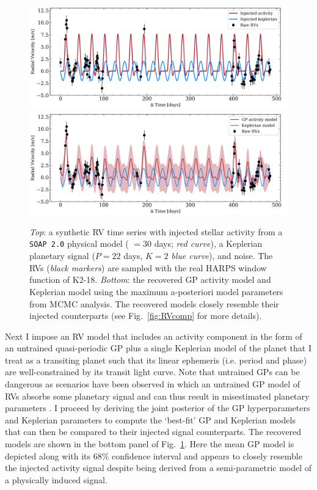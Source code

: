 \begin{figure}
  \centering
  \includegraphics[width=\hsize]{figures/RVinjected.png}
  \includegraphics[width=\hsize]{figures/RVrecovered.png}
  \caption[Synthetic RV time series used to demonstrate the effectiveness of GP activity modelling.]
          {\emph{Top}: a synthetic RV time series with injected stellar activity from a \texttt{SOAP 2.0} physical
            model (\prot{} $=30$ days; \emph{red curve}), a Keplerian planetary signal ($P=22$ days, $K=2$ \mps{;}
            \emph{blue curve}), and noise.
            The RVs (\emph{black markers}) are sampled with the real HARPS window
            function of K2-18. \emph{Bottom}: the recovered GP activity model and Keplerian model using the
            maximum a-posteriori model parameters from MCMC analysis. The recovered models closely resemble their
            injected counterparts (see Fig.~\ref{fig:RVcomp} for more details).}
  \label{fig:RVsignals}
\end{figure}

Next I impose an RV model that includes an activity component in the form of an untrained
quasi-periodic GP plus a single Keplerian model of the planet that I treat as a transiting
planet such that its linear ephemeris (i.e. period and phase) are well-constrained by its transit
light curve. Note that untrained GPs can be dangerous as scenarios have been observed in which
an untrained GP model of RVs absorbs some planetary signal and can thus result in misestimated
planetary parameters \citep{ribas18}.
I proceed by deriving the joint posterior of the GP hyperparameters and Keplerian
parameters to compute the `best-fit' GP and Keplerian models that can then be compared to their
injected signal counterparts. The recovered models are shown in the bottom panel of
Fig.~\ref{fig:RVsignals}. Here the mean GP model is depicted along with its 68\% confidence
interval and appears to closely resemble the injected activity signal despite being derived from
a semi-parametric model of a physically induced signal. \\

